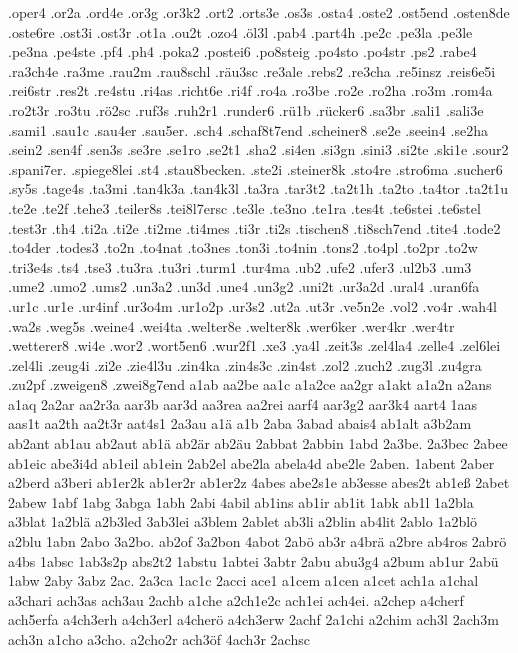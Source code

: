 {.oper4
.or2a
.ord4e
.or3g
.or3k2
.ort2
.orts3e
.os3s
.osta4
.oste2
.ost5end
.osten8de
.oste6re
.ost3i
.ost3r
.ot1a
.ou2t
.ozo4
.öl3l
.pab4
.part4h
.pe2c
.pe3la
.pe3le
.pe3na
.pe4ste
.pf4
.ph4
.poka2
.postei6
.po8steig
.po4sto
.po4str
.ps2
.rabe4
.ra3ch4e
.ra3me
.rau2m
.rau8schl
.räu3sc
.re3ale
.rebs2
.re3cha
.re5insz
.reis6e5i
.rei6str
.res2t
.re4stu
.ri4as
.richt6e
.ri4f
.ro4a
.ro3be
.ro2e
.ro2ha
.ro3m
.rom4a
.ro2t3r
.ro3tu
.rö2sc
.ruf3s
.ruh2r1
.runder6
.rü1b
.rücker6
.sa3br
.sali1
.sali3e
.sami1
.sau1c
.sau4er
.sau5er.
.sch4
.schaf8t7end
.scheiner8
.se2e
.seein4
.se2ha
.sein2
.sen4f
.sen3s
.se3re
.se1ro
.se2t1
.sha2
.si4en
.si3gn
.sini3
.si2te
.ski1e
.sour2
.spani7er.
.spiege8lei
.st4
.stau8becken.
.ste2i
.steiner8k
.sto4re
.stro6ma
.sucher6
.sy5s
.tage4s
.ta3mi
.tan4k3a
.tan4k3l
.ta3ra
.tar3t2
.ta2t1h
.ta2to
.ta4tor
.ta2t1u
.te2e
.te2f
.tehe3
.teiler8s
.tei8l7ersc
.te3le
.te3no
.te1ra
.tes4t
.te6stei
.te6stel
.test3r
.th4
.ti2a
.ti2e
.ti2me
.ti4mes
.ti3r
.ti2s
.tischen8
.ti8sch7end
.tite4
.tode2
.to4der
.todes3
.to2n
.to4nat
.to3nes
.ton3i
.to4nin
.tons2
.to4pl
.to2pr
.to2w
.tri3e4s
.ts4
.tse3
.tu3ra
.tu3ri
.turm1
.tur4ma
.ub2
.ufe2
.ufer3
.ul2b3
.um3
.ume2
.umo2
.ums2
.un3a2
.un3d
.une4
.un3g2
.uni2t
.ur3a2d
.ural4
.uran6fa
.ur1c
.ur1e
.ur4inf
.ur3o4m
.ur1o2p
.ur3s2
.ut2a
.ut3r
.ve5n2e
.vol2
.vo4r
.wah4l
.wa2s
.weg5s
.weine4
.wei4ta
.welter8e
.welter8k
.wer6ker
.wer4kr
.wer4tr
.wetterer8
.wi4e
.wor2
.wort5en6
.wur2f1
.xe3
.ya4l
.zeit3s
.zel4la4
.zelle4
.zel6lei
.zel4li
.zeug4i
.zi2e
.zie4l3u
.zin4ka
.zin4s3c
.zin4st
.zol2
.zuch2
.zug3l
.zu4gra
.zu2pf
.zweigen8
.zwei8g7end
a1ab
aa2be
aa1c
a1a2ce
aa2gr
a1akt
a1a2n
a2ans
a1aq
2a2ar
aa2r3a
aar3b
aar3d
aa3rea
aa2rei
aarf4
aar3g2
aar3k4
aart4
1aas
aas1t
aa2th
aa2t3r
aat4s1
2a3au
a1ä
a1b
2aba
3abad
abais4
ab1alt
a3b2am
ab2ant
ab1au
ab2aut
ab1ä
ab2är
ab2äu
2abbat
2abbin
1abd
2a3be.
2a3bec
2abee
ab1eic
abe3i4d
ab1eil
ab1ein
2ab2el
abe2la
abela4d
abe2le
2aben.
1abent
2aber
a2berd
a3beri
ab1er2k
ab1er2r
ab1er2z
4abes
abe2s1e
ab3esse
abes2t
ab1eß
2abet
2abew
1abf
1abg
3abga
1abh
2abi
4abil
ab1ins
ab1ir
ab1it
1abk
ab1l
1a2bla
a3blat
1a2blä
a2b3led
3ab3lei
a3blem
2ablet
ab3li
a2blin
ab4lit
2ablo
1a2blö
a2blu
1abn
2abo
3a2bo.
ab2of
3a2bon
4abot
2abö
ab3r
a4brä
a2bre
ab4ros
2abrö
a4bs
1absc
1ab3s2p
abs2t2
1abstu
1abtei
3abtr
2abu
abu3g4
a2bum
ab1ur
2abü
1abw
2aby
3abz
2ac.
2a3ca
1ac1c
2acci
ace1
a1cem
a1cen
a1cet
ach1a
a1chal
a3chari
ach3as
ach3au
2achb
a1che
a2ch1e2c
ach1ei
ach4ei.
a2chep
a4cherf
ach5erfa
a4ch3erh
a4ch3erl
a4cherö
a4ch3erw
2achf
2a1chi
a2chim
ach3l
2ach3m
ach3n
a1cho
a3cho.
a2cho2r
ach3öf
4ach3r
2achsc
}
